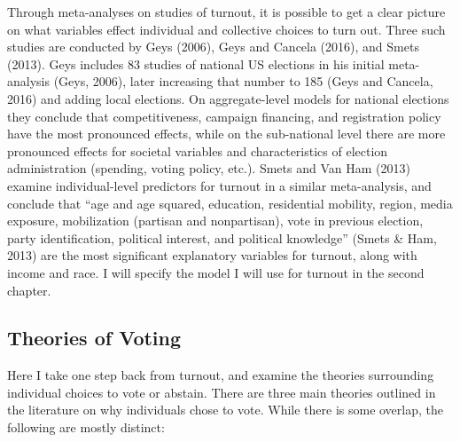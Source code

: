 \documentclass[12pt,twoside]{reedthesis}
\begin{document}
  Through meta-analyses on studies of turnout, it is possible to get a
  clear picture on what variables effect individual and collective choices
  to turn out. Three such studies are conducted by Geys (2006), Geys and
  Cancela (2016), and Smets (2013). Geys includes 83 studies of national
  US elections in his initial meta-analysis (Geys, 2006), later increasing
  that number to 185 (Geys and Cancela, 2016) and adding local elections.
  On aggregate-level models for national elections they conclude that
  competitiveness, campaign financing, and registration policy have the
  most pronounced effects, while on the sub-national level there are more
  pronounced effects for societal variables and characteristics of
  election administration (spending, voting policy, etc.). Smets and Van
  Ham (2013) examine individual-level predictors for turnout in a similar
  meta-analysis, and conclude that ``age and age squared, education,
  residential mobility, region, media exposure, mobilization (partisan and
  nonpartisan), vote in previous election, party identification, political
  interest, and political knowledge'' (Smets \& Ham, 2013) are the most
  significant explanatory variables for turnout, along with income and
  race. I will specify the model I will use for turnout in the second
  chapter.
  
  \subsection{Theories of Voting}\label{theories-of-voting}
  
  Here I take one step back from turnout, and examine the theories
  surrounding individual choices to vote or abstain. There are three main
  theories outlined in the literature on why individuals chose to vote.
  While there is some overlap, the following are mostly distinct:
  
\end{document}
